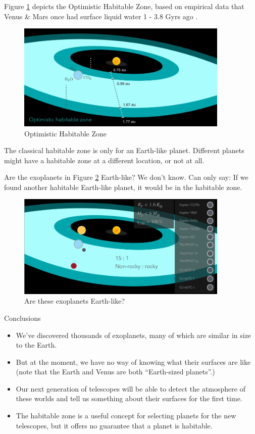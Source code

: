 \documentclass[]{article}
\begin{document}
Figure \ref{fig:optimistic:habitable:zone} depicts the Optimistic Habitable Zone, based on empirical data that Venus \& Mars once had surface liquid water 1 - 3.8 Gyrs ago \cite{kasting1993habitable}.
\cite{kopparapu2013habitable}
\begin{figure}[H]
	\caption{Optimistic Habitable Zone }\label{fig:optimistic:habitable:zone}
	    \includegraphics[width=0.9\textwidth]{OptimisticHabitableZone.jpg}
\end{figure}

The classical habitable zone is only for an Earth-like planet. Different planets might have a habitable zone at a different location, or not at all.

Are the exoplanets in Figure \ref{fig:are:these:earthlike} Earth-like? We don’t know. Can only say: If we found another habitable Earth-like planet, it would be in the habitable zone.

\begin{figure}
	\caption{Are these exoplanets Earth-like?}\label{fig:are:these:earthlike}
	\includegraphics[width=0.9\textwidth]{AreTheseEarthlike}
\end{figure}

Conclusions

\begin{itemize}
	\item We’ve discovered thousands of exoplanets, many of which are similar in
	size to the Earth.
	\item But at the moment, we have no way of knowing what their surfaces are
	like (note that the Earth and Venus are both “Earth-sized planets”.)
	\item Our next generation of telescopes will be able to detect the atmosphere
	of these worlds and tell us something about their surfaces for the first
	time.
	\item The habitable zone is a useful concept for selecting planets for the 	new telescopes, but it offers no guarantee that a planet is habitable.
\end{itemize}
\end{document}
